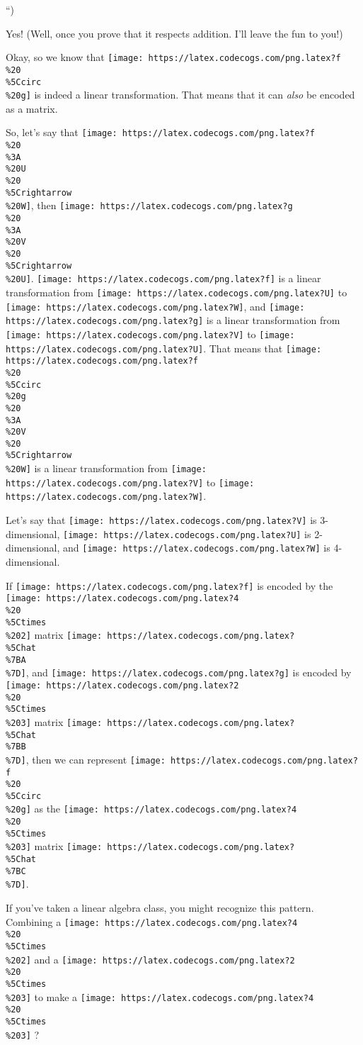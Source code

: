 \documentclass[]{article}
\begin{document}
``)

Yes! (Well, once you prove that it respects addition. I'll leave the fun to
you!)

Okay, so we know that
\texttt{[image: https://latex.codecogs.com/png.latex?f\\\%20\\\%5Ccirc\\\%20g]} is
indeed a linear transformation. That means that it can \emph{also} be encoded as
a matrix.

So, let's say that
\texttt{[image: https://latex.codecogs.com/png.latex?f\\\%20\\\%3A\\\%20U\\\%20\\\%5Crightarrow\\\%20W]},
then
\texttt{[image: https://latex.codecogs.com/png.latex?g\\\%20\\\%3A\\\%20V\\\%20\\\%5Crightarrow\\\%20U]}.
\texttt{[image: https://latex.codecogs.com/png.latex?f]} is a linear
transformation from \texttt{[image: https://latex.codecogs.com/png.latex?U]} to
\texttt{[image: https://latex.codecogs.com/png.latex?W]}, and
\texttt{[image: https://latex.codecogs.com/png.latex?g]} is a linear
transformation from \texttt{[image: https://latex.codecogs.com/png.latex?V]} to
\texttt{[image: https://latex.codecogs.com/png.latex?U]}. That means that
\texttt{[image: https://latex.codecogs.com/png.latex?f\\\%20\\\%5Ccirc\\\%20g\\\%20\\\%3A\\\%20V\\\%20\\\%5Crightarrow\\\%20W]}
is a linear transformation from
\texttt{[image: https://latex.codecogs.com/png.latex?V]} to
\texttt{[image: https://latex.codecogs.com/png.latex?W]}.

Let's say that \texttt{[image: https://latex.codecogs.com/png.latex?V]} is
3-dimensional, \texttt{[image: https://latex.codecogs.com/png.latex?U]} is
2-dimensional, and \texttt{[image: https://latex.codecogs.com/png.latex?W]} is
4-dimensional.

If \texttt{[image: https://latex.codecogs.com/png.latex?f]} is encoded by the
\texttt{[image: https://latex.codecogs.com/png.latex?4\\\%20\\\%5Ctimes\\\%202]}
matrix \texttt{[image: https://latex.codecogs.com/png.latex?\\\%5Chat\\\%7BA\\\%7D]},
and \texttt{[image: https://latex.codecogs.com/png.latex?g]} is encoded by
\texttt{[image: https://latex.codecogs.com/png.latex?2\\\%20\\\%5Ctimes\\\%203]}
matrix \texttt{[image: https://latex.codecogs.com/png.latex?\\\%5Chat\\\%7BB\\\%7D]},
then we can represent
\texttt{[image: https://latex.codecogs.com/png.latex?f\\\%20\\\%5Ccirc\\\%20g]} as the
\texttt{[image: https://latex.codecogs.com/png.latex?4\\\%20\\\%5Ctimes\\\%203]}
matrix \texttt{[image: https://latex.codecogs.com/png.latex?\\\%5Chat\\\%7BC\\\%7D]}.

If you've taken a linear algebra class, you might recognize this pattern.
Combining a
\texttt{[image: https://latex.codecogs.com/png.latex?4\\\%20\\\%5Ctimes\\\%202]} and a
\texttt{[image: https://latex.codecogs.com/png.latex?2\\\%20\\\%5Ctimes\\\%203]} to
make a
\texttt{[image: https://latex.codecogs.com/png.latex?4\\\%20\\\%5Ctimes\\\%203]} ?
\end{document}
